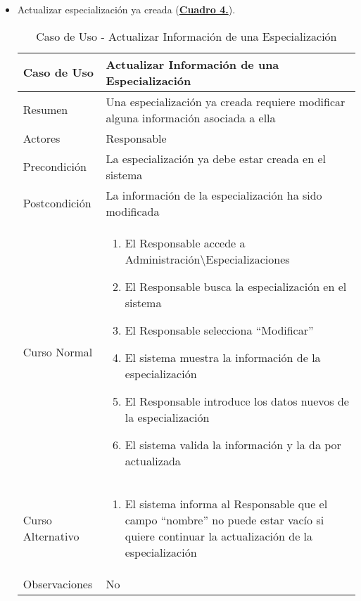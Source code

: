 \begin{itemize}
  \newpage~
	\item \addtocounter{tabla}{1} Actualizar especialización ya creada (\textbf{\hyperref[tab:curActualizarEspec]{Cuadro 4.}}).
		\begin{table}[!htbp]
		  \centering  \addtocounter{casouso}{1}
		  \begin{tabular}{|l | p{100mm}|}
		    \textbf{Caso de Uso}  & \textbf{Actualizar Información de una Especialización} \\ \hline
		    Resumen 		 & Una especialización ya creada requiere modificar alguna información asociada a ella \\ \hline
		    Actores  		 & Responsable \\ \hline
		    Precondición  	 & La especialización ya debe estar creada en el sistema  \\ \hline
		    Postcondición  	 & La información de la especialización ha sido modificada \\ \hline
		    Curso Normal   	 & \begin{enumerate}
			  \item El Responsable accede a Administración\textbackslash Especializaciones
			  \item El Responsable busca la especialización en el sistema
			  \item El Responsable selecciona ``Modificar''
			  \item El sistema muestra la información de la especialización
			  \item El Responsable introduce los datos nuevos de la especialización
			  \item El sistema valida la información y la da por actualizada
		    \end{enumerate}  \\ \hline
		    Curso Alternativo  & \begin{enumerate}
			  \item El sistema informa al Responsable que el campo ``nombre'' no puede estar vacío si quiere continuar la actualización de la especialización
		    \end{enumerate}  \\ \hline
		    Observaciones 	 & No  \\ \hline
		  \end{tabular}
		  \caption{Caso de Uso  - Actualizar Información de una Especialización}
		  \label{tab:curActualizarEspec}
		\end{table}
		\FloatBarrier
	

\end{itemize}
